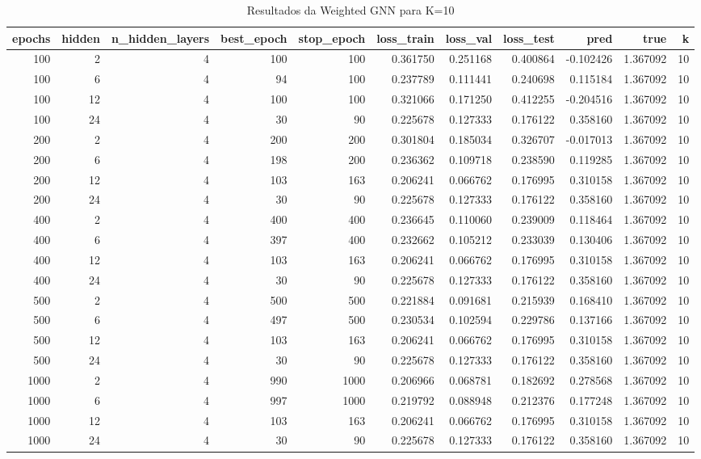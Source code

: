 \begin{table}
\caption{Resultados da Weighted GNN para K=10}
\label{tab:weighted_gnn_results_k10}
\begin{tabular}{rrrrrrrrrrr}
\toprule
epochs & hidden & n\_hidden\_layers & best\_epoch & stop\_epoch & loss\_train & loss\_val & loss\_test & pred & true & k \\
\midrule
100 & 2 & 4 & 100 & 100 & 0.361750 & 0.251168 & 0.400864 & -0.102426 & 1.367092 & 10 \\
100 & 6 & 4 & 94 & 100 & 0.237789 & 0.111441 & 0.240698 & 0.115184 & 1.367092 & 10 \\
100 & 12 & 4 & 100 & 100 & 0.321066 & 0.171250 & 0.412255 & -0.204516 & 1.367092 & 10 \\
100 & 24 & 4 & 30 & 90 & 0.225678 & 0.127333 & 0.176122 & 0.358160 & 1.367092 & 10 \\
200 & 2 & 4 & 200 & 200 & 0.301804 & 0.185034 & 0.326707 & -0.017013 & 1.367092 & 10 \\
200 & 6 & 4 & 198 & 200 & 0.236362 & 0.109718 & 0.238590 & 0.119285 & 1.367092 & 10 \\
200 & 12 & 4 & 103 & 163 & 0.206241 & 0.066762 & 0.176995 & 0.310158 & 1.367092 & 10 \\
200 & 24 & 4 & 30 & 90 & 0.225678 & 0.127333 & 0.176122 & 0.358160 & 1.367092 & 10 \\
400 & 2 & 4 & 400 & 400 & 0.236645 & 0.110060 & 0.239009 & 0.118464 & 1.367092 & 10 \\
400 & 6 & 4 & 397 & 400 & 0.232662 & 0.105212 & 0.233039 & 0.130406 & 1.367092 & 10 \\
400 & 12 & 4 & 103 & 163 & 0.206241 & 0.066762 & 0.176995 & 0.310158 & 1.367092 & 10 \\
400 & 24 & 4 & 30 & 90 & 0.225678 & 0.127333 & 0.176122 & 0.358160 & 1.367092 & 10 \\
500 & 2 & 4 & 500 & 500 & 0.221884 & 0.091681 & 0.215939 & 0.168410 & 1.367092 & 10 \\
500 & 6 & 4 & 497 & 500 & 0.230534 & 0.102594 & 0.229786 & 0.137166 & 1.367092 & 10 \\
500 & 12 & 4 & 103 & 163 & 0.206241 & 0.066762 & 0.176995 & 0.310158 & 1.367092 & 10 \\
500 & 24 & 4 & 30 & 90 & 0.225678 & 0.127333 & 0.176122 & 0.358160 & 1.367092 & 10 \\
1000 & 2 & 4 & 990 & 1000 & 0.206966 & 0.068781 & 0.182692 & 0.278568 & 1.367092 & 10 \\
1000 & 6 & 4 & 997 & 1000 & 0.219792 & 0.088948 & 0.212376 & 0.177248 & 1.367092 & 10 \\
1000 & 12 & 4 & 103 & 163 & 0.206241 & 0.066762 & 0.176995 & 0.310158 & 1.367092 & 10 \\
1000 & 24 & 4 & 30 & 90 & 0.225678 & 0.127333 & 0.176122 & 0.358160 & 1.367092 & 10 \\
\bottomrule
\end{tabular}
\end{table}
